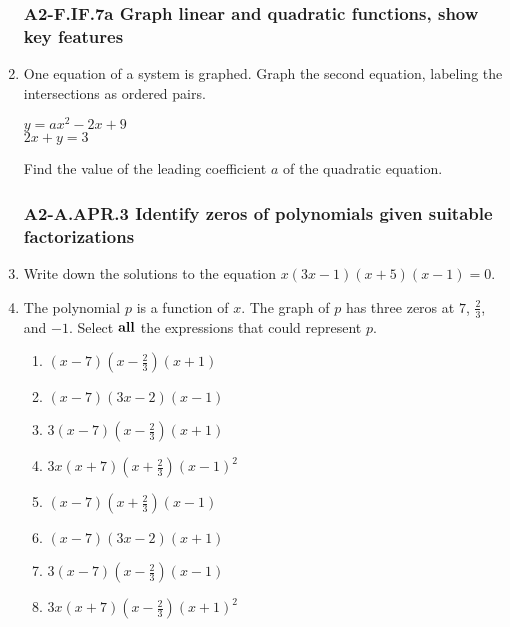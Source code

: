 \documentclass[12pt, twoside]{article}
\begin{document}
\begin{enumerate}[itemsep=0.5cm]
\newpage
\subsubsection*{A2-F.IF.7a Graph linear and quadratic functions, show key features}
\item One equation of a system is graphed. Graph the second equation, labeling the intersections as ordered pairs.

    \begin{multicols}{2}
      $y = ax^2 - 2x + 9$ \\
      \columnbreak
      $2x + y = 3$
      \end{multicols}
      Find the value of the leading coefficient $a$ of the quadratic equation. \vspace{2cm}
  
    \begin{center}
    \end{center}
  

\newpage
\subsubsection*{A2-A.APR.3 Identify zeros of polynomials given suitable factorizations}
\item Write down the solutions to the equation $x(3x - 1)(x + 5)(x - 1) = 0$. \vspace{2cm} 

\item The polynomial $p$ is a function of $x$. The graph of $p$ has three zeros at $7$, $\frac{2}{3}$, and $-1$. Select $\bf{all}$ the expressions that could represent $p$. \vspace{0.25cm}
    \begin{multicols}{2}
    \begin{enumerate}
        \item $(x-7)(x-\frac{2}{3})(x+1)$
        \item $(x-7)(3x-2)(x-1)$
        \item $3(x-7)(x-\frac{2}{3})(x+1)$
        \item $3x(x+7)(x+\frac{2}{3})(x-1)^2$
        \item $(x-7)(x+\frac{2}{3})(x-1)$
        \item $(x-7)(3x-2)(x+1)$
        \item $3(x-7)(x-\frac{2}{3})(x-1)$
        \item $3x(x+7)(x-\frac{2}{3})(x+1)^2$
    \end{enumerate}
    \end{multicols}
        \vspace{0.5cm}


\end{enumerate}
\end{document}
